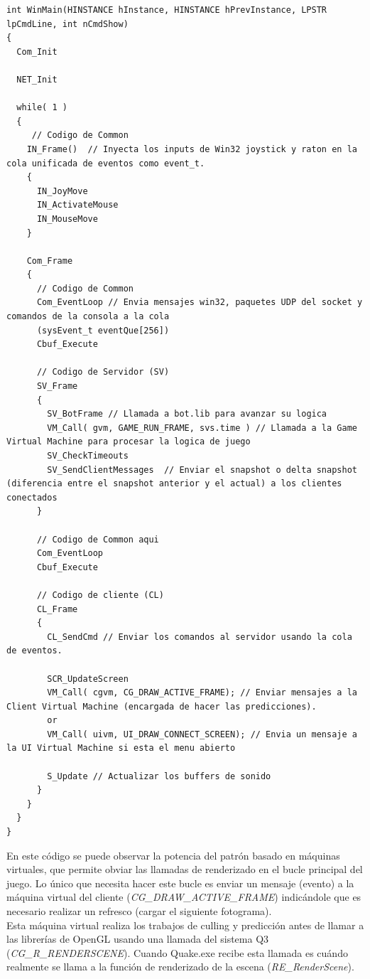 \documentclass[a4paper,12pt]{report}
\begin{document}
	\begin{lstlisting}[style=C, numbers=none]
int WinMain(HINSTANCE hInstance, HINSTANCE hPrevInstance, LPSTR lpCmdLine, int nCmdShow)
{
  Com_Init
	
  NET_Init
	
  while( 1 )
  {
     // Codigo de Common 
    IN_Frame()  // Inyecta los inputs de Win32 joystick y raton en la cola unificada de eventos como event_t.
    {
      IN_JoyMove
      IN_ActivateMouse
      IN_MouseMove
    }
    
    Com_Frame
    {
      // Codigo de Common 
      Com_EventLoop // Envia mensajes win32, paquetes UDP del socket y comandos de la consola a la cola
      (sysEvent_t eventQue[256])
      Cbuf_Execute
      
      // Codigo de Servidor (SV)
      SV_Frame
      {
        SV_BotFrame // Llamada a bot.lib para avanzar su logica
        VM_Call( gvm, GAME_RUN_FRAME, svs.time ) // Llamada a la Game Virtual Machine para procesar la logica de juego
        SV_CheckTimeouts
        SV_SendClientMessages  // Enviar el snapshot o delta snapshot (diferencia entre el snapshot anterior y el actual) a los clientes conectados
      } 
      
      // Codigo de Common aqui
      Com_EventLoop
      Cbuf_Execute
      
      // Codigo de cliente (CL)
      CL_Frame
      {
        CL_SendCmd // Enviar los comandos al servidor usando la cola de eventos.
        
        SCR_UpdateScreen
        VM_Call( cgvm, CG_DRAW_ACTIVE_FRAME); // Enviar mensajes a la Client Virtual Machine (encargada de hacer las predicciones).
        or
        VM_Call( uivm, UI_DRAW_CONNECT_SCREEN); // Envia un mensaje a la UI Virtual Machine si esta el menu abierto
        
        S_Update // Actualizar los buffers de sonido
      }
    }
  }
}
	\end{lstlisting}

    En este código se puede observar la potencia del patrón basado en máquinas virtuales, que permite obviar las llamadas de renderizado en el bucle principal del juego. Lo único que necesita hacer este bucle es enviar un mensaje (evento) a la máquina virtual del cliente (\textit{CG\_DRAW\_ACTIVE\_FRAME}) indicándole que es necesario realizar un refresco (cargar el siguiente fotograma).\\
    
    Esta máquina virtual realiza los trabajos de culling y predicción antes de llamar a las librerías de OpenGL usando una llamada del sistema Q3 (\textit{CG\_R\_RENDERSCENE}). Cuando Quake.exe recibe esta llamada es cuándo realmente se llama a la función de renderizado de la escena (\textit{RE\_RenderScene}).\cite{unrolled_loop_source}\cite{unrolled_loop}\\   
    
\end{document}
